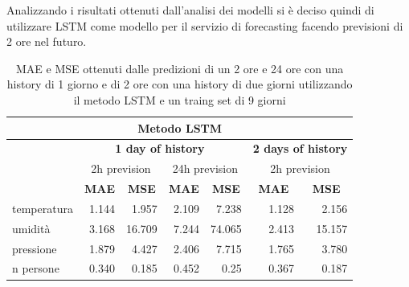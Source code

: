 \documentclass{article}
\begin{document}
Analizzando i risultati ottenuti dall'analisi dei modelli si è deciso quindi di utilizzare LSTM come modello per il servizio di forecasting facendo previsioni di 2 ore nel futuro.


\begin{table}
\centering
\begin{tabular}{l|r|r|r|r|r|r}
\multicolumn{7}{c}{{\cellcolor[rgb]{0.875,0.875,0.875}} Metodo LSTM}                                                                                                                                                                              \\ 
\hline
\rowcolor[rgb]{0.753,0.753,0.753}           & \multicolumn{4}{c|}{\textbf{ 1 day of history~ } }                                                                                            & \multicolumn{2}{c}{ \textbf{2 days of history}}              \\ 
\hline
\rowcolor[rgb]{0.875,0.875,0.875}           & \multicolumn{2}{c|}{2h prevision}                                     & \multicolumn{2}{c|}{24h prevision }                                   & \multicolumn{2}{c}{ 2h prevision}                   \\ 
\hline
\rowcolor[rgb]{0.753,0.753,0.753}           & \multicolumn{1}{c|}{\textbf{MAE}} & \multicolumn{1}{c|}{\textbf{MSE}} & \multicolumn{1}{c|}{\textbf{MAE}} & \multicolumn{1}{c|}{\textbf{MSE}} & \multicolumn{1}{c|}{\textbf{MAE}} & \multicolumn{1}{c}{\textbf{MSE}}  \\ 
\hline
temperatura                                 & 1.144                             & 1.957                             & 2.109                             & 7.238                             & 1.128                    & 2.156                    \\
\rowcolor[rgb]{0.875,0.875,0.875} umidità   & 3.168                             & 16.709                            & 7.244                             & 74.065                            & 2.413                    & 15.157                   \\
pressione                                   & 1.879                             & 4.427                             & 2.406                             & 7.715                             & 1.765                    & 3.780                    \\
\rowcolor[rgb]{0.875,0.875,0.875} n persone & 0.340                             & 0.185                             & 0.452                             & 0.25                              & 0.367                    & 0.187                   
\end{tabular}
\caption{MAE e MSE ottenuti dalle predizioni di un 2 ore e 24 ore con una history di 1 giorno e di 2 ore con una history di due giorni utilizzando il metodo LSTM e un traing set di 9 giorni}
\label{tab:lstm}
\end{table}
\end{document}
